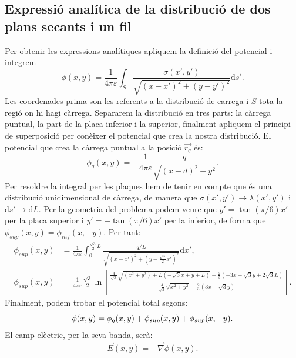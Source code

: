 \documentclass[a4paper,10.5pt]{report}
\begin{document}
\begin{appendices}
\subsection{Expressió analítica de la distribució de dos plans secants i un fil}
\label{an:a6}
Per obtenir les expressions analítiques apliquem la definició del potencial i integrem
\begin{equation}
	\phi (x,y) = \frac{1}{4\pi\varepsilon}\int_S\frac{\sigma(x',y')}{\sqrt{(x-x')^2+(y-y')^2}}\mathrm{d}s'.
\end{equation}
Les coordenades prima son les referents a la distribució de carrega i $S$ tota la regió on hi hagi càrrega. Separarem la distribució en tres parts: la càrrega puntual, la part de la placa inferior i la superior, finalment apliquem el principi de superposició per conèixer el potencial que crea la nostra distribució. El potencial que crea la càrrega puntual a la posició $\vec{r_q}$ és:
\begin{equation}
	\phi_q (x,y) = -\frac{1}{4\pi\varepsilon}\frac{q}{\sqrt{(x-d)^2+y^2}}.
\end{equation}
Per resoldre la integral per les plaques hem de tenir en compte que és una distribució unidimensional de càrrega, de manera que $\sigma(x',y') \rightarrow \lambda(x',y')$ i $\mathrm{d}s' \rightarrow \mathrm{d}L$. Per la geometria del problema podem veure que $y' = \tan(\pi/6)x'$ per la placa superior i $y' = -\tan(\pi/6)x'$ per la inferior, de forma que $\phi_{sup}(x,y) = \phi_{inf}(x,-y)$. Per tant:
\begin{align}
	\phi_{sup}(x,y)&=\frac{1}{4\pi\varepsilon}\int_{0}^{\frac{\sqrt{3}}{2}L} \frac{q/L}{\sqrt{(x-x')^2+(y-\frac{\sqrt{3}}{2}x')^2}}\mathrm{d}x', \\
	\phi_{sup}(x,y)&=\frac{1}{4\pi\varepsilon}\frac{\sqrt{3}}{2}\ln \left[\frac{\frac{4}{\sqrt{3}}\sqrt{(x^2+y^2)+L(-\sqrt{3}x+y+L)}+\frac{2}{3}(-3x+\sqrt{3}y+2\sqrt{3}L)}{\frac{4}{\sqrt{3}}\sqrt{x^2+y^2}-\frac{2}{3}(3x-\sqrt{3}y)}\right].
\end{align}
Finalment, podem trobar el potencial total segons:
\begin{equation}
	\phi(x,y) = \phi_q(x,y) + \phi_{sup}(x,y) + \phi_{sup}(x,-y). \\
\end{equation}
El camp elèctric, per la seva banda, serà:
\begin{equation}
	\vec{E}(x,y) = -\vec{\nabla}\phi(x,y).
\end{equation}
\newpage

\end{appendices}
\end{document}
